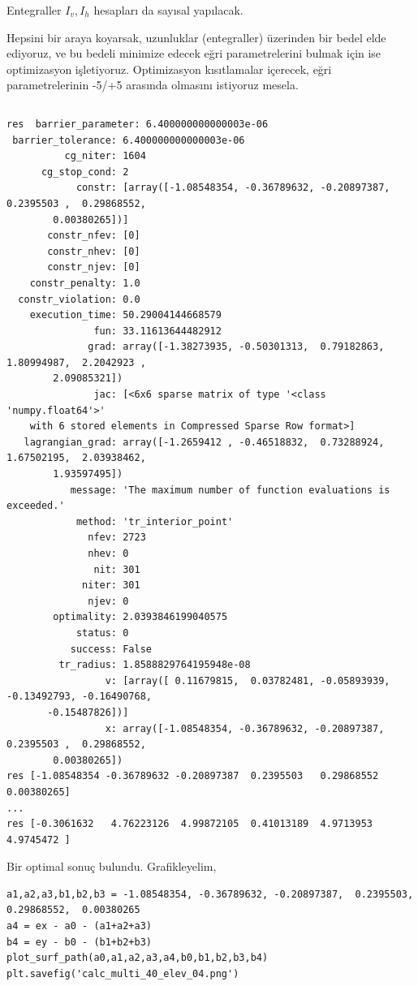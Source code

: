 \documentclass[12pt,fleqn]{article}\usepackage{../../common}
\begin{document}
Entegraller $I_v,I_h$ hesapları da sayısal yapılacak.

Hepsini bir araya koyarsak, uzunluklar (entegraller) üzerinden bir bedel
elde ediyoruz, ve bu bedeli minimize edecek eğri parametrelerini bulmak
için ise optimizasyon işletiyoruz. Optimizasyon kısıtlamalar içerecek, eğri
parametrelerinin -5/+5 arasında olmasını istiyoruz mesela.

\inputminted[fontsize=\footnotesize]{python}{paths2.py}

\begin{verbatim}
res  barrier_parameter: 6.400000000000003e-06
 barrier_tolerance: 6.400000000000003e-06
          cg_niter: 1604
      cg_stop_cond: 2
            constr: [array([-1.08548354, -0.36789632, -0.20897387,  0.2395503 ,  0.29868552,
        0.00380265])]
       constr_nfev: [0]
       constr_nhev: [0]
       constr_njev: [0]
    constr_penalty: 1.0
  constr_violation: 0.0
    execution_time: 50.29004144668579
               fun: 33.11613644482912
              grad: array([-1.38273935, -0.50301313,  0.79182863,  1.80994987,  2.2042923 ,
        2.09085321])
               jac: [<6x6 sparse matrix of type '<class 'numpy.float64'>'
	with 6 stored elements in Compressed Sparse Row format>]
   lagrangian_grad: array([-1.2659412 , -0.46518832,  0.73288924,  1.67502195,  2.03938462,
        1.93597495])
           message: 'The maximum number of function evaluations is exceeded.'
            method: 'tr_interior_point'
              nfev: 2723
              nhev: 0
               nit: 301
             niter: 301
              njev: 0
        optimality: 2.0393846199040575
            status: 0
           success: False
         tr_radius: 1.8588829764195948e-08
                 v: [array([ 0.11679815,  0.03782481, -0.05893939, -0.13492793, -0.16490768,
       -0.15487826])]
                 x: array([-1.08548354, -0.36789632, -0.20897387,  0.2395503 ,  0.29868552,
        0.00380265])
res [-1.08548354 -0.36789632 -0.20897387  0.2395503   0.29868552  0.00380265]
...
res [-0.3061632   4.76223126  4.99872105  0.41013189  4.9713953   4.9745472 ]
\end{verbatim}

Bir optimal sonuç bulundu. Grafikleyelim,

\begin{verbatim}
a1,a2,a3,b1,b2,b3 = -1.08548354, -0.36789632, -0.20897387,  0.2395503,   0.29868552,  0.00380265
a4 = ex - a0 - (a1+a2+a3)
b4 = ey - b0 - (b1+b2+b3)
plot_surf_path(a0,a1,a2,a3,a4,b0,b1,b2,b3,b4)
plt.savefig('calc_multi_40_elev_04.png')
\end{verbatim}
\end{document}
